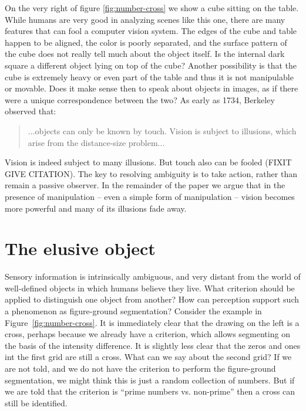 %
%
On the very right of figure \ref{fig:number-cross} we show a 
cube sitting on the table. While humans are very good in analyzing
scenes like this one, there are many features that can fool
a computer vision system. The edges of the cube and table 
happen to be aligned, the color is poorly separated, and the surface
pattern of the cube does not really tell much about the object
itself. Is the internal dark square a different object lying on 
top of the cube? Another possibility is that the cube is extremely
heavy or even part of the table and thus it is not manipulable or
movable. Does it make sense then to speak about objects in images,
as if there were a unique correspondence between the two?
As early as 1734, Berkeley observed that:
%
\begin{quote}
...objects can only be known by
touch. Vision is subject to illusions, which arise from the
distance-size problem... \cite{berkeley72new}
\end{quote}
%
Vision is indeed subject to many illusions.  But touch also can be
fooled (FIXIT GIVE CITATION).
The key to resolving ambiguity is to take action, rather than remain
a passive observer.
In the remainder of the paper we argue that in the presence of
manipulation -- even a simple form of manipulation -- vision 
becomes more powerful and many of its illusions fade away.



\ifverbose 

\section{The elusive object}

\label{sect:introduction}

Sensory information is intrinsically ambiguous, and very distant from
the world of well-defined objects in which humans believe they live.  
What criterion should be applied to distinguish one object from
another?  How can perception support such a phenomenon as figure-ground
segmentation?  
Consider the example in Figure~\ref{fig:number-cross}.  It is
immediately clear that the drawing on the left is a cross, perhaps
because we already have a criterion, which allows segmenting on the
basis of the intensity difference. It is slightly less clear that the
zeros and ones int the first grid are still a cross. What can we say
about the second grid? If we are not told, and we do not have
the criterion to perform the figure-ground segmentation, we might
think this is just a random collection of numbers. But if we are told
that the criterion is ``prime numbers vs. non-prime'' then a cross can
still be identified.

